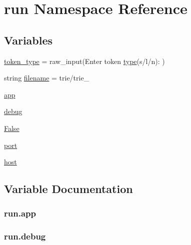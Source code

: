 \hypertarget{namespacerun}{}\section{run Namespace Reference}
\label{namespacerun}
\subsection*{Variables}
\begin{DoxyCompactItemize}
\item 
\hyperlink{namespacerun_a3aa049fb1bff73ee4abc5c3807357b14}{token\+\_\+type} = raw\+\_\+input(\textquotesingle{}Enter token \hyperlink{jquery-3_82_81_8js_a4c4533b7d49de290bb8cccd4e6f43349}{type}(s/l/n)\+: \textquotesingle{})
\item 
string \hyperlink{namespacerun_afdbd074667ab498dc4283bd9f6024021}{filename} = \textquotesingle{}trie/trie\+\_\+\textquotesingle{}
\item 
\hyperlink{namespacerun_a7fcda7c89f1e8edb85c99b2a8d625d53}{app}
\item 
\hyperlink{namespacerun_a24785e11198aac41f0051e51857331aa}{debug}
\item 
\hyperlink{namespacerun_aaeb0dc8420ee07880d7768c73bb3564a}{False}
\item 
\hyperlink{namespacerun_a7a6a5c33b9e900b36c2b941d5212210e}{port}
\item 
\hyperlink{namespacerun_af7767eb404b922097d7206695c016bad}{host}
\end{DoxyCompactItemize}


\subsection{Variable Documentation}
\subsubsection[{\texorpdfstring{app}{app}}]{\setlength{\rightskip}{0pt plus 5cm}run.\+app}\hypertarget{namespacerun_a7fcda7c89f1e8edb85c99b2a8d625d53}{}\label{namespacerun_a7fcda7c89f1e8edb85c99b2a8d625d53}
\subsubsection[{\texorpdfstring{debug}{debug}}]{\setlength{\rightskip}{0pt plus 5cm}run.\+debug}\hypertarget{namespacerun_a24785e11198aac41f0051e51857331aa}{}\label{namespacerun_a24785e11198aac41f0051e51857331aa}
